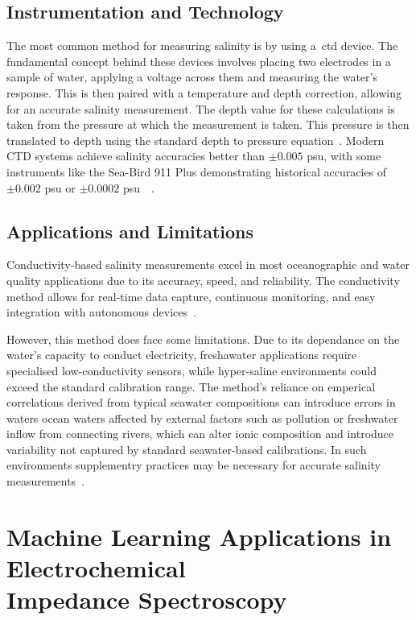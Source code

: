 \subsection{Instrumentation and Technology}
The most common method for measuring salinity is by using a~\gls{ctd} device.
The fundamental concept behind these devices involves placing two electrodes in a sample of water, applying a voltage across them and measuring the water's response. This is then paired with a temperature and depth correction, allowing for an accurate salinity measurement.
The depth value for these calculations is taken from the pressure at which the measurement is taken.
This pressure is then translated to depth using the standard depth to pressure equation~\cite{chip_based_ctd}.
Modern CTD systems achieve salinity accuracies better than $\pm0.005$ \gls{psu}, with some instruments like the Sea-Bird 911 Plus demonstrating historical accuracies of $\pm0.002$ \gls{psu} or $\pm0.0002$ \gls{psu}~\cite{chip_based_ctd}~\cite{ctd_accuracy}.

\subsection{Applications and Limitations}
Conductivity-based salinity measurements excel in most oceanographic and water quality applications due to its accuracy, speed, and reliability.
The conductivity method allows for real-time data capture, continuous monitoring, and easy integration with autonomous devices~\cite{roemmich_argo_2009}. 

However, this method does face some limitations. Due to its dependance on the water's capacity to conduct electricity, freshawater applications require specialised low-conductivity sensors, while hyper-saline environments could exceed the standard calibration range.
The method's reliance on emperical correlations derived from typical seawater compositions can introduce errors in waters ocean waters affected by external factors such as pollution or freshwater inflow from connecting rivers, which can alter ionic composition and introduce variability not captured by standard seawater-based calibrations.
In such environments supplementry practices may be necessary for accurate salinity measurements~\cite{uncles_estuarine_2002}.

\section{Machine Learning Applications in Electrochemical \\ Impedance Spectroscopy}
